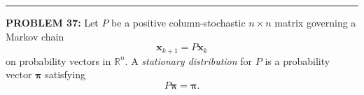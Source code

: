 \documentclass[12pt]{amsart}
\newcommand{\divider}{
  \vspace{-1em} %
  \noindent
  \raisebox{-0.15ex}{\textbullet}%
  \hspace{0.5em}%
  \rule[0.5ex]{0.95\textwidth}{1.0pt}%
  \hspace{0.5em}%
  \raisebox{-0.15ex}{\textbullet}%
  \vspace{0em} %
}
\begin{document}
%
%
%

\divider

{\bf PROBLEM 37:}
%
Let $P$ be a positive column-stochastic $n \times n$ matrix governing a Markov chain
\[
    \mathbf{x}_{k+1}=P\mathbf{x}_k
\]
on probability vectors in $\mathbb{R}^n$. A \emph{stationary distribution}
for $P$ is a probability vector $\boldsymbol{\pi}$ satisfying
\[
    P\boldsymbol{\pi}=\boldsymbol{\pi}.
\]
\end{document}
